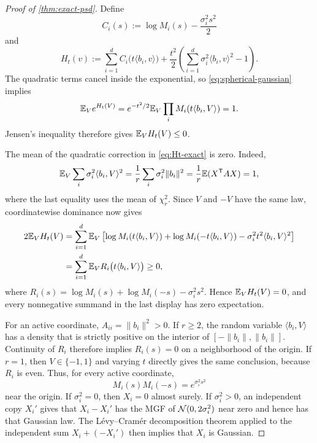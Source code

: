 \begin{proof}[Proof of \cref{thm:exact-psd}]
Define
\[
C_i(s):=\log M_i(s)-\frac{\sigma_i^2s^2}{2}
\]
and
\begin{equation}\label{eq:Ht-exact}
H_t(v):=\sum_{i=1}^d C_i\bigl(t\langle b_i,v\rangle\bigr)
 +\frac{t^2}{2}\left(\sum_{i=1}^d\sigma_i^2\langle b_i,v\rangle^2-1\right).
\end{equation}
The quadratic terms cancel inside the exponential, so \eqref{eq:spherical-gaussian} implies
\[
\mathbb E_V e^{H_t(V)}=e^{-t^2/2}\mathbb E_V\prod_iM_i(t\langle b_i,V\rangle)=1.
\]
Jensen's inequality therefore gives $\mathbb E_VH_t(V)\le0$.

The mean of the quadratic correction in \eqref{eq:Ht-exact} is zero. Indeed,
\[
\mathbb E_V\sum_i\sigma_i^2\langle b_i,V\rangle^2
 =\frac1r\sum_i\sigma_i^2\|b_i\|^2
 =\frac1r\mathbb E(X^{\mathsf T}AX)=1,
\]
where the last equality uses the mean of $\chi_r^2$. Since $V$ and $-V$ have the same law, coordinatewise dominance now gives
\begin{align*}
2\mathbb E_VH_t(V)
 &=\sum_{i=1}^d\mathbb E_V\left[
 \log M_i(t\langle b_i,V\rangle)+\log M_i(-t\langle b_i,V\rangle)
 -\sigma_i^2t^2\langle b_i,V\rangle^2\right]\\
 &=\sum_{i=1}^d\mathbb E_V R_i\bigl(t\langle b_i,V\rangle\bigr)\ge0,
\end{align*}
where $R_i(s)=\log M_i(s)+\log M_i(-s)-\sigma_i^2s^2$. Hence $\mathbb E_VH_t(V)=0$, and every nonnegative summand in the last display has zero expectation.

For an active coordinate, $A_{ii}=\|b_i\|^2>0$. If $r\ge2$, the random variable $\langle b_i,V\rangle$ has a density that is strictly positive on the interior of $[-\|b_i\|,\|b_i\|]$. Continuity of $R_i$ therefore implies $R_i(s)=0$ on a neighborhood of the origin. If $r=1$, then $V\in\{-1,1\}$ and varying $t$ directly gives the same conclusion, because $R_i$ is even. Thus, for every active coordinate,
\[
M_i(s)M_i(-s)=e^{\sigma_i^2s^2}
\]
near the origin. If $\sigma_i^2=0$, then $X_i=0$ almost surely. If $\sigma_i^2>0$, an independent copy $X_i'$ gives that $X_i-X_i'$ has the MGF of $\mathcal N(0,2\sigma_i^2)$ near zero and hence has that Gaussian law. The L\'evy--Cram\'er decomposition theorem applied to the independent sum $X_i+(-X_i')$ then implies that $X_i$ is Gaussian.

\end{proof}

